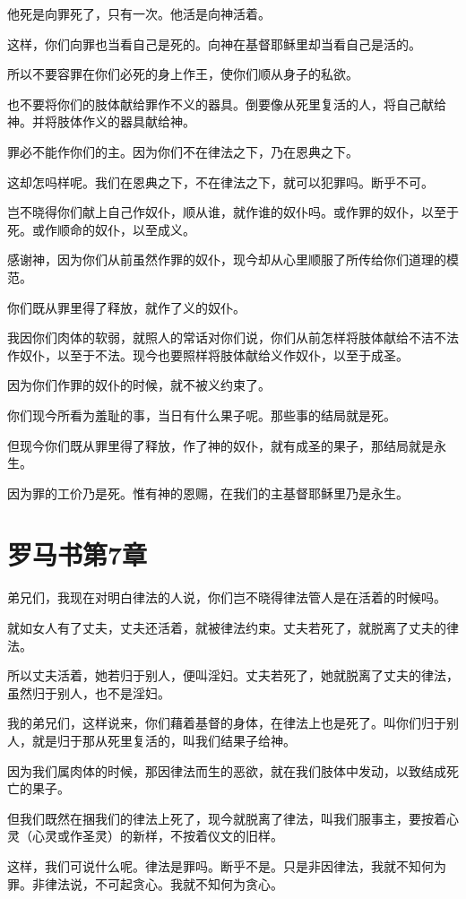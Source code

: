 \documentclass[12pt,oneside]{book}
\begin{document}
他死是向罪死了，只有一次。他活是向神活着。

这样，你们向罪也当看自己是死的。向神在基督耶稣里却当看自己是活的。

所以不要容罪在你们必死的身上作王，使你们顺从身子的私欲。

也不要将你们的肢体献给罪作不义的器具。倒要像从死里复活的人，将自己献给神。并将肢体作义的器具献给神。

罪必不能作你们的主。因为你们不在律法之下，乃在恩典之下。

这却怎吗样呢。我们在恩典之下，不在律法之下，就可以犯罪吗。断乎不可。

岂不晓得你们献上自己作奴仆，顺从谁，就作谁的奴仆吗。或作罪的奴仆，以至于死。或作顺命的奴仆，以至成义。

感谢神，因为你们从前虽然作罪的奴仆，现今却从心里顺服了所传给你们道理的模范。

你们既从罪里得了释放，就作了义的奴仆。

我因你们肉体的软弱，就照人的常话对你们说，你们从前怎样将肢体献给不洁不法作奴仆，以至于不法。现今也要照样将肢体献给义作奴仆，以至于成圣。

因为你们作罪的奴仆的时候，就不被义约束了。

你们现今所看为羞耻的事，当日有什么果子呢。那些事的结局就是死。

但现今你们既从罪里得了释放，作了神的奴仆，就有成圣的果子，那结局就是永生。

因为罪的工价乃是死。惟有神的恩赐，在我们的主基督耶稣里乃是永生。

\chapter{罗马书第7章}
弟兄们，我现在对明白律法的人说，你们岂不晓得律法管人是在活着的时候吗。

就如女人有了丈夫，丈夫还活着，就被律法约束。丈夫若死了，就脱离了丈夫的律法。

所以丈夫活着，她若归于别人，便叫淫妇。丈夫若死了，她就脱离了丈夫的律法，虽然归于别人，也不是淫妇。

我的弟兄们，这样说来，你们藉着基督的身体，在律法上也是死了。叫你们归于别人，就是归于那从死里复活的，叫我们结果子给神。

因为我们属肉体的时候，那因律法而生的恶欲，就在我们肢体中发动，以致结成死亡的果子。

但我们既然在捆我们的律法上死了，现今就脱离了律法，叫我们服事主，要按着心灵（心灵或作圣灵）的新样，不按着仪文的旧样。

这样，我们可说什么呢。律法是罪吗。断乎不是。只是非因律法，我就不知何为罪。非律法说，不可起贪心。我就不知何为贪心。
\end{document}
